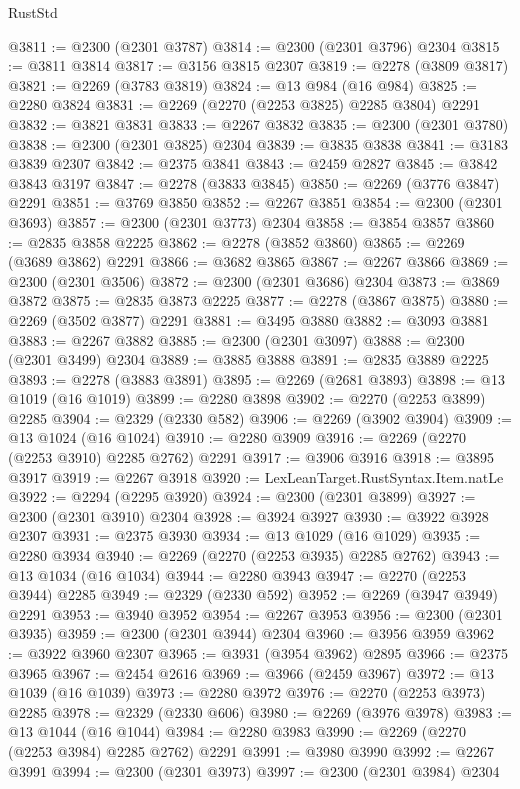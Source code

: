 \begin{lexlean}{RustStd}
\begin{coremodule}
{\begin{coremodule}
{{{{{{{{{{{{@3811 := @2300 (@2301 @3787)
@3814 := @2300 (@2301 @3796) @2304
@3815 := @3811 @3814
@3817 := @3156 @3815 @2307
@3819 := @2278 (@3809 @3817)
@3821 := @2269 (@3783 @3819)
@3824 := @13 @984 (@16 @984)
@3825 := @2280 @3824
@3831 := @2269 (@2270 (@2253 @3825) @2285 @3804) @2291
@3832 := @3821 @3831
@3833 := @2267 @3832
@3835 := @2300 (@2301 @3780)
@3838 := @2300 (@2301 @3825) @2304
@3839 := @3835 @3838
@3841 := @3183 @3839 @2307
@3842 := @2375 @3841
@3843 := @2459 @2827
@3845 := @3842 @3843 @3197
@3847 := @2278 (@3833 @3845)
@3850 := @2269 (@3776 @3847) @2291
@3851 := @3769 @3850
@3852 := @2267 @3851
@3854 := @2300 (@2301 @3693)
@3857 := @2300 (@2301 @3773) @2304
@3858 := @3854 @3857
@3860 := @2835 @3858 @2225
@3862 := @2278 (@3852 @3860)
@3865 := @2269 (@3689 @3862) @2291
@3866 := @3682 @3865
@3867 := @2267 @3866
@3869 := @2300 (@2301 @3506)
@3872 := @2300 (@2301 @3686) @2304
@3873 := @3869 @3872
@3875 := @2835 @3873 @2225
@3877 := @2278 (@3867 @3875)
@3880 := @2269 (@3502 @3877) @2291
@3881 := @3495 @3880
@3882 := @3093 @3881
@3883 := @2267 @3882
@3885 := @2300 (@2301 @3097)
@3888 := @2300 (@2301 @3499) @2304
@3889 := @3885 @3888
@3891 := @2835 @3889 @2225
@3893 := @2278 (@3883 @3891)
@3895 := @2269 (@2681 @3893)
@3898 := @13 @1019 (@16 @1019)
@3899 := @2280 @3898
@3902 := @2270 (@2253 @3899) @2285
@3904 := @2329 (@2330 @582)
@3906 := @2269 (@3902 @3904)
@3909 := @13 @1024 (@16 @1024)
@3910 := @2280 @3909
@3916 := @2269 (@2270 (@2253 @3910) @2285 @2762) @2291
@3917 := @3906 @3916
@3918 := @3895 @3917
@3919 := @2267 @3918
@3920 := LexLeanTarget.RustSyntax.Item.natLe
@3922 := @2294 (@2295 @3920)
@3924 := @2300 (@2301 @3899)
@3927 := @2300 (@2301 @3910) @2304
@3928 := @3924 @3927
@3930 := @3922 @3928 @2307
@3931 := @2375 @3930
@3934 := @13 @1029 (@16 @1029)
@3935 := @2280 @3934
@3940 := @2269 (@2270 (@2253 @3935) @2285 @2762)
@3943 := @13 @1034 (@16 @1034)
@3944 := @2280 @3943
@3947 := @2270 (@2253 @3944) @2285
@3949 := @2329 (@2330 @592)
@3952 := @2269 (@3947 @3949) @2291
@3953 := @3940 @3952
@3954 := @2267 @3953
@3956 := @2300 (@2301 @3935)
@3959 := @2300 (@2301 @3944) @2304
@3960 := @3956 @3959
@3962 := @3922 @3960 @2307
@3965 := @3931 (@3954 @3962) @2895
@3966 := @2375 @3965
@3967 := @2454 @2616
@3969 := @3966 (@2459 @3967)
@3972 := @13 @1039 (@16 @1039)
@3973 := @2280 @3972
@3976 := @2270 (@2253 @3973) @2285
@3978 := @2329 (@2330 @606)
@3980 := @2269 (@3976 @3978)
@3983 := @13 @1044 (@16 @1044)
@3984 := @2280 @3983
@3990 := @2269 (@2270 (@2253 @3984) @2285 @2762) @2291
@3991 := @3980 @3990
@3992 := @2267 @3991
@3994 := @2300 (@2301 @3973)
@3997 := @2300 (@2301 @3984) @2304
}}}}}}}}}}}}
\end{coremodule}}
\end{coremodule}
\end{lexlean}
